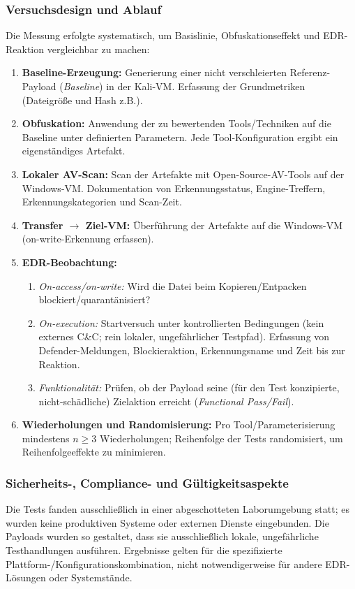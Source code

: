 \subsubsection{Versuchsdesign und Ablauf}
Die Messung erfolgte systematisch, um Basislinie, Obfuskationseffekt und EDR-Reaktion vergleichbar zu machen:
\begin{enumerate}
  \item \textbf{Baseline-Erzeugung:} Generierung einer nicht verschleierten Referenz-Payload (\emph{Baseline}) in der Kali-VM. Erfassung der Grundmetriken (Dateigröße und Hash z.B.).
  \item \textbf{Obfuskation:} Anwendung der zu bewertenden Tools/Techniken auf die Baseline unter definierten Parametern. Jede Tool-Konfiguration ergibt ein eigenständiges Artefakt.
  \item \textbf{Lokaler AV-Scan:} Scan der Artefakte mit Open-Source-AV-Tools auf der Windows-VM. Dokumentation von Erkennungsstatus, Engine-Treffern, Erkennungskategorien und Scan-Zeit.
  \item \textbf{Transfer \texorpdfstring{$\rightarrow$}{->} Ziel-VM:} Überführung der Artefakte auf die Windows-VM (on-write-Erkennung erfassen).
  \item \textbf{EDR-Beobachtung:} 
    \begin{enumerate}
      \item \emph{On-access/on-write:} Wird die Datei beim Kopieren/Entpacken blockiert/quarantänisiert?
      \item \emph{On-execution:} Startversuch unter kontrollierten Bedingungen (kein externes C\&C; rein lokaler, ungefährlicher Testpfad). Erfassung von Defender-Meldungen, Blockieraktion, Erkennungsname und Zeit bis zur Reaktion.
      \item \emph{Funktionalität:} Prüfen, ob der Payload seine (für den Test konzipierte, nicht-schädliche) Zielaktion erreicht (\emph{Functional Pass/Fail}).
    \end{enumerate}
  \item \textbf{Wiederholungen und Randomisierung:} Pro Tool/Parameterisierung mindestens $n \geq 3$ Wiederholungen; Reihenfolge der Tests randomisiert, um Reihenfolgeeffekte zu minimieren.
\end{enumerate}
\subsubsection{Sicherheits-, Compliance- und Gültigkeitsaspekte}
Die Tests fanden ausschließlich in einer abgeschotteten Laborumgebung statt; es wurden keine produktiven Systeme oder externen Dienste eingebunden. Die Payloads wurden so gestaltet, dass sie ausschließlich lokale, ungefährliche Testhandlungen ausführen. Ergebnisse gelten für die spezifizierte Plattform-/Konfigurationskombination, nicht notwendigerweise für andere EDR-Lösungen oder Systemstände.
